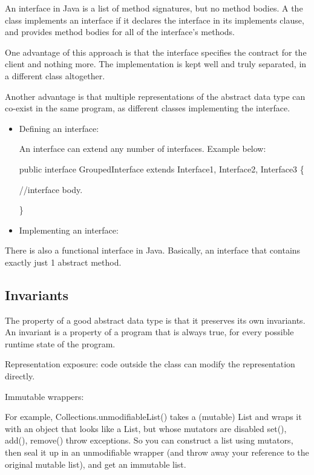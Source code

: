 \documentclass[letterpaper,12pt]{article}
\begin{document}
An interface in Java is a list of method signatures, but no method bodies. A
the class implements an interface if it declares the interface in its implements
clause, and provides method bodies for all of the interface's methods.

One advantage of this approach is that the interface specifies the contract for
the client and nothing more. The implementation is kept well and truly
separated, in a different class altogether.

Another advantage is that multiple representations of the abstract
data type can co-exist in the same program, as different classes implementing
the interface.

\begin{itemize}
      \item Defining an interface:

            An interface can extend any number of interfaces. Example below:

            public interface GroupedInterface extends Interface1, Interface2, Interface3 \{

            //interface body.

            \}

      \item Implementing an interface:

\end{itemize}

There is also a functional interface in Java. Basically, an interface that
contains exactly just 1 abstract method.

\subsection{Invariants}

The property of a good abstract data type is that it preserves its own invariants.
An invariant is a property of a program that is always true, for every possible
runtime state of the program.

Representation exposure: code outside the class can modify the representation
directly.

Immutable wrappers:

For example, Collections.unmodifiableList() takes a (mutable) List and wraps it
with an object that looks like a List, but whose mutators are disabled set(),
add(), remove() throw exceptions. So you can construct a list using mutators,
then seal it up in an unmodifiable wrapper (and throw away your reference to
the original mutable list), and get an immutable list.
\end{document}
